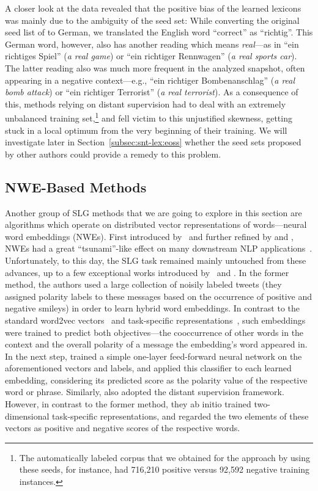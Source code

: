 A closer look at the data revealed that the positive bias of the
learned lexicons was mainly due to the ambiguity of the seed set:
While converting the original seed list of \citet{Turney:03} to
German, we translated the English word ``correct'' as ``richtig''.
This German word, however, also has another reading which means
\emph{real}---as in ``ein richtiges Spiel'' (\emph{a real game}) or
``ein richtiger Rennwagen'' (\emph{a real sports car}).  The latter
reading also was much more frequent in the analyzed snapshot, often
appearing in a negative context---e.g., ``ein richtiger
Bombenanschlag'' (\emph{a real bomb attack}) or ``ein richtiger
Terrorist'' (\emph{a real terrorist}).  As a consequence of this,
methods relying on distant supervision had to deal with an extremely
unbalanced training set,\footnote{The automatically labeled corpus
  that we obtained for the approach by \citet{Kiritchenko:14} using
  these seeds, for instance, had 716,210 positive versus 92,592
  negative training instances.} and fell victim to this unjustified
skewness, getting stuck in a local optimum from the very beginning of
their training.  We will investigate later in
Section~\ref{subsec:snt-lex:eoss} whether the seed sets proposed by
other authors could provide a remedy to this problem.

\subsection{NWE-Based Methods}

Another group of SLG methods that we are going to explore in this
section are algorithms which operate on distributed vector
representations of words---neural word embeddings (NWEs).  First
introduced by~\citet{Bengio:03} and further refined by
\citet{Collobert:11} and \citet{Mikolov:13}, NWEs had a great
``tsunami''-like effect on many downstream NLP
applications~\cite{Manning:15}.  Unfortunately, to this day, the SLG
task remained mainly untouched from these advances, up to a few
exceptional works introduced by~\citet{Tang:14a} and \citet{Vo:16}.
In the former method, the authors used a large collection of noisily
labeled tweets (they assigned polarity labels to these messages based
on the occurrence of positive and negative smileys) in order to learn
hybrid word embeddings.  In contrast to the standard word2vec
vectors~\cite{Mikolov:13} and task-specific
representations~\cite{Collobert:11}, such embeddings were trained to
predict both objectives---the cooccurrence of other words in the
context and the overall polarity of a message the embedding's word
appeared in.  In the next step, \citet{Tang:14a} trained a simple
one-layer feed-forward neural network on the aforementioned vectors
and labels, and applied this classifier to each learned embedding,
considering its predicted score as the polarity value of the
respective word or phrase.  Similarly, \citet{Vo:16} also adopted the
distant supervision framework.  However, in contrast to the former
method, they ab initio trained two-dimensional task-specific
representations, and regarded the two elements of these vectors as
positive and negative scores of the respective words.

